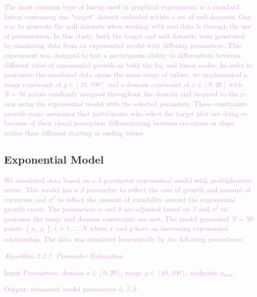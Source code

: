 \documentclass[]{interact}
\theoremstyle{plain}%
\theoremstyle{definition}
\theoremstyle{remark}
\begin{document}
\textcolor{Plum}{
The most common type of lineup used in graphical experiments is a standard lineup containing one "target" dataset embeded within a set of null datasets. 
One way to generate the null datasets when working with real data is through the use of permutation. 
In this study, both the target and null datasets were generated by simulating data from an exponential model with differing parameters. 
This experiment was designed to test a participants ability to differentiate between different rates of exponential growth on both the log and linear scales. 
In order to gaurantee the simulated data spans the same range of values, we implemented a range constraint of $y\in [10,100]$ and a domain constraint of $x\in [0,20]$ with $N = 50$ points randomly assigned throughout the domain and mapped to the y-axis using the exponential model with the selected paramters. 
These constraints provide some assurance that participants who select the target plot are doing so because of their visual perception differentiating between curvature or slope rather than different starting or ending values. 
}

\hypertarget{exponential-model}{%
\subsection{Exponential Model}\label{exponential-model}}

\textcolor{Plum}{
We simulated data based on a 3-parameter exponential model with multiplicative errors. 
This model has a $\beta$ parameter to reflect the rate of growth and amount of curvature and $\sigma^2$ to reflect the amount of variability around the exponential growth curve. 
The parameters $\alpha$ and $\theta$ are adjusted based on $\beta$ and $\sigma^2$ to gauranee the range and domain constraints are met. 
The model generated $N = 50$ points $(x_i, y_i), i = 1,...,N$ where $x$ and $y$ have an increasing exponential relationship. 
The data was simulated heuristically by the following procedures:
}
\vspace{3 mm}

\textcolor{Plum}{\textit{Algorithm 2.1.1: Paremeter Estimation}}

\textcolor{Plum}{Input Parameters: domain $x\in[0,20]$, range $y\in[10,100]$, midpoint $x_{mid}$.}

\textcolor{Plum}{Output: estimated model parameters $\hat\alpha, \hat\beta, \hat\theta$}
\end{document}

